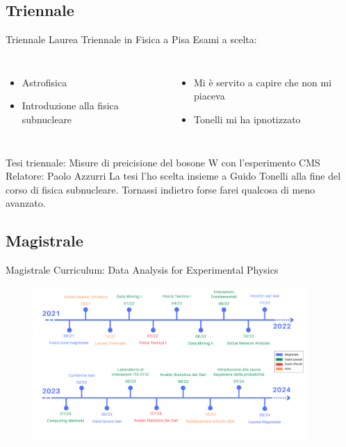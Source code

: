 \documentclass[
10pt,
aspectratio=169,
]{beamer}
\begin{document}
\subsection{Triennale}
\begin{frame}{Triennale}
Laurea Triennale in Fisica a Pisa 
\vfill
Esami a scelta:
\begin{columns}
\begin{itemize}
    \item Astrofisica 
    \item Introduzione alla fisica subnucleare
\end{itemize}
\begin{itemize}
    \item Mi è servito a capire che non mi piaceva
    \item Tonelli mi ha ipnotizzato
\end{itemize}
    \end{columns}
    \vfill
    Tesi triennale: Misure di preicisione del bosone W con l'esperimento CMS\\
    Relatore: Paolo Azzurri
    \vfill
    La tesi l'ho scelta insieme a Guido Tonelli alla fine del corso di fisica subnucleare. Tornassi indietro forse farei qualcosa di meno avanzato.
\end{frame}
\subsection{Magistrale}

\begin{frame}{Magistrale}
Curriculum: Data Analysis for Experimental Physics

    \begin{figure}
        \centering
        \includegraphics[width=0.93\textwidth]{timeline.pdf}
    \end{figure}
\end{frame}
\end{document}
